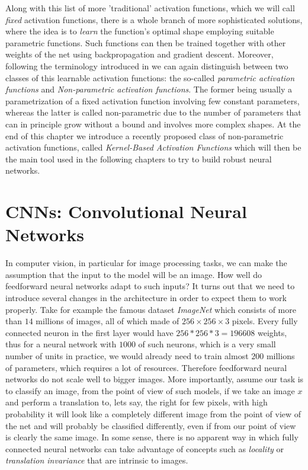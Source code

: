 \documentclass[LaM,binding=0.6cm]{./packages/sapthesis/sapthesis}
\begin{document}
            Along with this list of more 'traditional' activation functions, which we will call \textit{fixed} activation functions, there is a whole branch of
            more sophisticated solutions, where the idea is to \textit{learn} the function's optimal shape employing suitable parametric functions. 
            Such functions can then be trained together with other weights of the net using backpropagation and gradient descent. Moreover, following the terminology
            introduced in \cite{kafnets} we can again distinguish between two classes of this learnable activation functions: the so-called
            \textit{parametric activation functions} and \textit{Non-parametric activation functions}. The former being usually a parametrization of a fixed 
            activation function involving few constant parameters, whereas the latter is called non-parametric due to the number of parameters that can in principle
            grow without a bound and involves more complex shapes. At the end of this chapter we introduce a recently proposed class of non-parametric activation functions,
            called \textit{Kernel-Based Activation Functions} which will then be the main tool used in the following chapters to try to build 
             robust neural networks.    


        \section{CNNs: Convolutional Neural Networks}

            \label{cnns}
            In computer vision, in particular for image processing tasks, we can make the assumption that the input to the model will be an image. 
            How well do feedforward neural networks adapt to such inputs? It turns out that we need to introduce several changes in the architecture in order to expect 
            them to work properly. Take for example the famous dataset \textit{ImageNet} which consists of more than $ 14 $ millions of images,
            all of which made of $ 256 \times 256 \times 3 $ pixels. Every fully connected neuron in the first layer would have $ 256 * 256 * 3 =  196608 $ weights,
            thus for a neural network with $ 1000 $ of such neurons, which is a very small number of units in practice, we would already need to train almost $ 200 $ millions of parameters,
            which requires a lot of resources. Therefore feedforward neural networks do not scale well to bigger images. More importantly, assume our task is to 
            classify an image, from the point of view of such models, if we take an image $x$ and perform a translation to, lets say, the right for few pixels, with high 
            probability it will look like a completely different image from the point of view of the net and will probably be classified differently, even if 
            from our point of view is clearly the same image. In some sense, there is no apparent way in which fully connected neural networks can take advantage of 
            concepts such as \textit{locality} or \textit{translation invariance} that are intrinsic to images.
            
\end{document}

